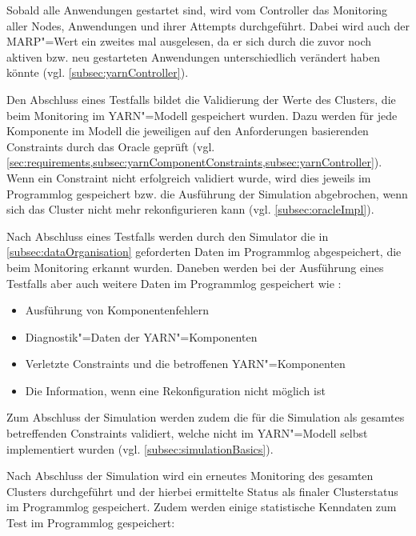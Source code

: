Sobald alle Anwendungen gestartet sind, wird vom Controller das Monitoring aller Nodes, Anwendungen und ihrer Attempts durchgeführt.
Dabei wird auch der \gls{MARP}"=Wert ein zweites mal ausgelesen, da er sich durch die zuvor noch aktiven bzw. neu gestarteten Anwendungen unterschiedlich verändert haben könnte (vgl. \cref{subsec:yarnController}).

Den Abschluss eines Testfalls bildet die Validierung der Werte des Clusters, die beim Monitoring im YARN"=Modell gespeichert wurden.
Dazu werden für jede Komponente im Modell die jeweiligen auf den Anforderungen basierenden Constraints durch das Oracle geprüft (vgl. \cref{sec:requirements,subsec:yarnComponentConstraints,subsec:yarnController}).
Wenn ein Constraint nicht erfolgreich validiert wurde, wird dies jeweils im Programmlog gespeichert bzw. die Ausführung der Simulation abgebrochen, wenn sich das Cluster nicht mehr rekonfigurieren kann (vgl. \cref{subsec:oracleImpl}).

Nach Abschluss eines Testfalls werden durch den Simulator die in \cref{subsec:dataOrganisation} geforderten Daten im Programmlog abgespeichert, die beim Monitoring erkannt wurden.
Daneben werden bei der Ausführung eines Testfalls aber auch weitere Daten im Programmlog gespeichert wie \zB:

\begin{itemize}
    \item Ausführung von Komponentenfehlern
    \item Diagnostik"=Daten der YARN"=Komponenten
    \item Verletzte Constraints und die betroffenen YARN"=Komponenten
    \item Die Information, wenn eine Rekonfiguration nicht möglich ist
\end{itemize}

Zum Abschluss der Simulation werden zudem die für die Simulation als gesamtes betreffenden Constraints validiert, welche nicht im YARN"=Modell selbst implementiert wurden (vgl. \cref{subsec:simulationBasics}).

Nach Abschluss der Simulation wird ein erneutes Monitoring des gesamten Clusters durchgeführt und der hierbei ermittelte Status als finaler Clusterstatus im Programmlog gespeichert.
Zudem werden einige statistische Kenndaten zum Test im Programmlog gespeichert:

